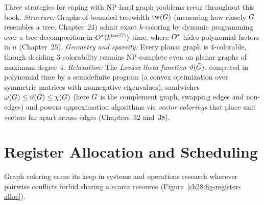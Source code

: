 \begin{connectionbox}
Three strategies for coping with NP-hard graph problems recur throughout this book.
\emph{Structure:} Graphs of bounded treewidth $\operatorname{tw}(G)$ (measuring how closely $G$ resembles a tree; Chapter~24) admit exact $k$-coloring by dynamic
programming over a tree decomposition in $O^\star(k^{\operatorname{tw}(G)})$ time, where $O^\star$ hides polynomial factors in $n$ (Chapter~25). \emph{Geometry and sparsity:} Every planar graph is
$4$-colorable, though deciding $3$-colorability remains NP-complete even on planar graphs of maximum degree $4$.
\emph{Relaxation:} The \emph{Lov\'asz theta function} $\vartheta(\bar{G})$, computed in polynomial time by a semidefinite program (a convex optimization over symmetric matrices with nonnegative eigenvalues), sandwiches $\omega(G)\le\vartheta(\bar{G})\le\chi(G)$ (here $\bar{G}$ is the complement graph, swapping edges and non-edges) and powers approximation algorithms via \emph{vector colorings} that place unit vectors far apart across edges (Chapters~32 and~38).
\end{connectionbox}

\section{Register Allocation and Scheduling}
\label{ch28:applications}

Graph coloring earns its keep in systems and operations research wherever pairwise conflicts forbid sharing a scarce resource (Figure~\ref{ch28:fig-register-alloc}).

